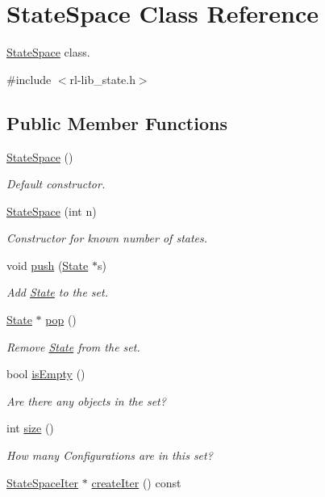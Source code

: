 \hypertarget{classStateSpace}{\section{State\-Space Class Reference}
\label{classStateSpace}
}


\hyperlink{classStateSpace}{State\-Space} class.  




{\ttfamily \#include $<$rl-\/lib\-\_\-state.\-h$>$}

\subsection*{Public Member Functions}
\begin{DoxyCompactItemize}
\item 
\hyperlink{classStateSpace_a9809804afcf94ebe347e19300d1a072e}{State\-Space} ()
\begin{DoxyCompactList}\small\item\em Default constructor. \end{DoxyCompactList}\item 
\hyperlink{classStateSpace_a432d9ee4a72d3f6da5f0d09f2656a8ae}{State\-Space} (int n)
\begin{DoxyCompactList}\small\item\em Constructor for known number of states. \end{DoxyCompactList}\item 
void \hyperlink{classStateSpace_a261398949f30aa06ad9c5ed4b2426cb1}{push} (\hyperlink{classState}{State} $\ast$s)
\begin{DoxyCompactList}\small\item\em Add \hyperlink{classState}{State} to the set. \end{DoxyCompactList}\item 
\hyperlink{classState}{State} $\ast$ \hyperlink{classStateSpace_add66f2ade4b11919338ed101241f281a}{pop} ()
\begin{DoxyCompactList}\small\item\em Remove \hyperlink{classState}{State} from the set. \end{DoxyCompactList}\item 
bool \hyperlink{classStateSpace_a0a4d75d9f92d513220743e8ca4621d65}{is\-Empty} ()
\begin{DoxyCompactList}\small\item\em Are there any objects in the set? \end{DoxyCompactList}\item 
int \hyperlink{classStateSpace_a531782c8f2e1fdffcfbd4127b383477f}{size} ()
\begin{DoxyCompactList}\small\item\em How many Configurations are in this set? \end{DoxyCompactList}\item 
\hypertarget{classStateSpace_aa93bb010b217aa918ac2f68758d51247}{\hyperlink{classStateSpaceIter}{State\-Space\-Iter} $\ast$ \hyperlink{classStateSpace_aa93bb010b217aa918ac2f68758d51247}{create\-Iter} () const }\label{classStateSpace_aa93bb010b217aa918ac2f68758d51247}


\end{DoxyCompactItemize}
